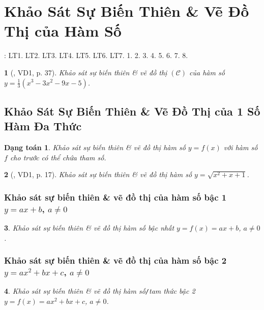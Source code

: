 \documentclass{article}
\newtheorem{baitoan}{}
\newtheorem{dangtoan}{Dạng toán}
\begin{document}

\section{Khảo Sát Sự Biến Thiên \& Vẽ Đồ Thị của Hàm Số}
\cite[Chap. I, \S4, pp. 28--44]{SGK_Toan_12_Canh_Dieu_tap_1}: LT1. LT2. LT3. LT4. LT5. LT6. LT7. 1. 2. 3. 4. 5. 6. 7. 8.

\begin{baitoan}[\cite{SGK_Toan_12_giai_tich_nang_cao}, VD1, p. 37]
	Khảo sát sự biến thiên \& vẽ đồ thị $(\mathcal{C})$ của hàm số $y = \frac{1}{3}(x^3 - 3x^2 - 9x - 5)$.
\end{baitoan}

\subsection{Khảo Sát Sự Biến Thiên \& Vẽ Đồ Thị của 1 Số Hàm Đa Thức}

\begin{dangtoan}
	Khảo sát sự biến thiên \& vẽ đồ thị hàm số $y = f(x)$ với hàm số $f$ cho trước có thể chứa tham số.
\end{dangtoan}

\begin{baitoan}[\cite{TLCT_giai_tich_12}, VD1, p. 17]
	Khảo sát sự biến thiên \& vẽ đồ thị hàm số $y = \sqrt{x^2 + x + 1}$.
\end{baitoan}

\subsubsection{Khảo sát sự biến thiên \& vẽ đồ thị của hàm số bậc 1 $y = ax + b$, $a\ne 0$}

\begin{baitoan}
	Khảo sát sự biến thiên \& vẽ đồ thị hàm số bậc nhất $y = f(x) = ax + b$, $a\ne 0$.
\end{baitoan}

\subsubsection{Khảo sát sự biến thiên \& vẽ đồ thị của hàm số bậc 2 $y = ax^2 + bx + c$, $a\ne 0$}

\begin{baitoan}
	Khảo sát sự biến thiên \& vẽ đồ thị hàm số\emph{\texttt{/}}tam thức bậc 2 $y = f(x) = ax^2 + bx + c$, $a\ne 0$.
\end{baitoan}
\end{document}
